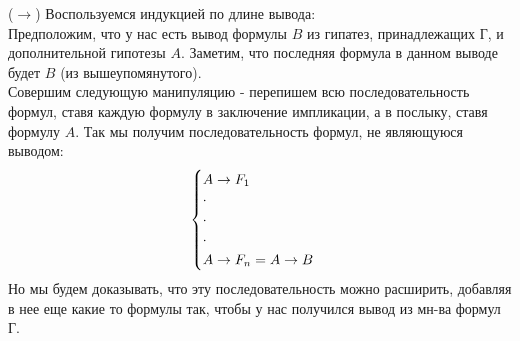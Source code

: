 ($\rightarrow$) Воспользуемся индукцией по длине вывода:\\
Предположим, что у нас есть вывод формулы $B$ из гипатез, принадлежащих Г, и дополнительной гипотезы $A$.
Заметим, что последняя формула в данном выводе будет $B$ (из вышеупомянутого). \\
Совершим следующую манипуляцию - перепишем всю последовательность формул, ставя каждую формулу в заключение импликации, а в послыку, ставя формулу $A$. Так мы получим последовательность формул, не являющуюся выводом:
\begin{equation*}
    \begin{cases}
    A \rightarrow F_1\\
    \cdot\\
    \cdot\\
    \cdot\\
    A \rightarrow F_n = A \rightarrow B\\
    \end{cases}
    \end{equation*}
Но мы будем доказывать, что эту последовательность можно расширить, добавляя в нее еще какие то формулы так, чтобы у нас получился вывод из мн-ва формул Г.\\



